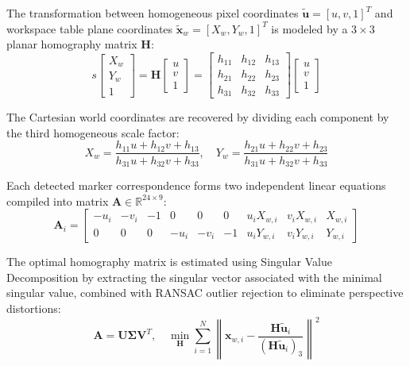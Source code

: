 \documentclass{svproc}
\begin{document}
The transformation between homogeneous pixel coordinates $\tilde{\mathbf{u}} = [u, v, 1]^T$ and workspace table plane coordinates $\tilde{\mathbf{x}}_w = [X_w, Y_w, 1]^T$ is modeled by a $3 \times 3$ planar homography matrix $\mathbf{H}$:
\begin{equation}
    s \begin{bmatrix} X_w \\ Y_w \\ 1 \end{bmatrix} = \mathbf{H} \begin{bmatrix} u \\ v \\ 1 \end{bmatrix} = \begin{bmatrix} h_{11} & h_{12} & h_{13} \\ h_{21} & h_{22} & h_{23} \\ h_{31} & h_{32} & h_{33} \end{bmatrix} \begin{bmatrix} u \\ v \\ 1 \end{bmatrix}
\end{equation}

The Cartesian world coordinates are recovered by dividing each component by the third homogeneous scale factor:
\begin{equation}
    X_w = \frac{h_{11}u + h_{12}v + h_{13}}{h_{31}u + h_{32}v + h_{33}}, \quad Y_w = \frac{h_{21}u + h_{22}v + h_{23}}{h_{31}u + h_{32}v + h_{33}}
\end{equation}

Each detected marker correspondence forms two independent linear equations compiled into matrix $\mathbf{A} \in \mathbb{R}^{24 \times 9}$:
\begin{equation}
    \mathbf{A}_i = \begin{bmatrix} -u_i & -v_i & -1 & 0 & 0 & 0 & u_i X_{w,i} & v_i X_{w,i} & X_{w,i} \\ 0 & 0 & 0 & -u_i & -v_i & -1 & u_i Y_{w,i} & v_i Y_{w,i} & Y_{w,i} \end{bmatrix}
\end{equation}

The optimal homography matrix is estimated using Singular Value Decomposition by extracting the singular vector associated with the minimal singular value, combined with RANSAC outlier rejection to eliminate perspective distortions:
\begin{equation}
    \mathbf{A} = \mathbf{U} \mathbf{\Sigma} \mathbf{V}^T, \quad \min_{\mathbf{H}} \sum_{i=1}^N \left\| \mathbf{x}_{w,i} - \frac{\mathbf{H} \tilde{\mathbf{u}}_i}{(\mathbf{H} \tilde{\mathbf{u}}_i)_3} \right\|^2
\end{equation}
\end{document}
